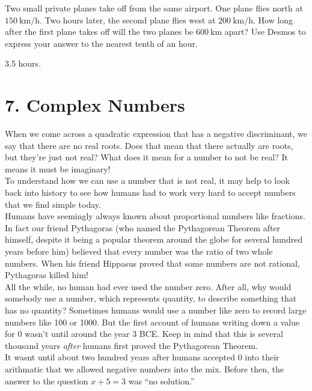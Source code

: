 \documentclass[12pt,fleqn]{book}
\newcommand{\prb}[1]{\begin{Exercise}#1\end{Exercise}}
\newcommand{\sol}[1]{\begin{Answer}#1\end{Answer}}
\begin{document}
\prb{Two small private planes take off from the same airport. One plane flies north at $150 \mathrm{~km} / \mathrm{h}$. Two hours later, the second plane flies west at $200 \mathrm{~km} / \mathrm{h}$. How long after the first plane takes off will the two planes be $600 \mathrm{~km}$ apart? Use Desmos to express your answer to the nearest tenth of an hour.}
\sol{3.5 hours.}













\chapter{7. Complex Numbers}
When we come across a quadratic expression that has a negative discriminant, we say that there are no real roots.  Does that mean that there actually are roots, but they're just not real?  What does it mean for a number to not be real?  It means it must be imaginary!
\\[1em]
To understand how we can use a number that is not real, it may help to look back into history to see how humans had to work very hard to accept numbers that we find simple today.
\\[1em]
Humans have seemingly always known about proportional numbers like fractions.  In fact our friend Pythagoras (who named the Pythagorean Theorem after himself, despite it being a popular theorem around the globe for several hundred years before him) believed that every number was the ratio of two whole numbers.  When his friend Hippasus proved that some numbers are not rational, Pythagoras killed him!
\\[1em]
All the while, no human had ever used the number zero.  After all, why would somebody use a number, which represents quantity, to describe something that has no quantity?  Sometimes humans would use a number like zero to record large numbers like 100 or 1000.  But the first account of humans writing down a value for 0 wasn't until around the year 3 BCE.  Keep in mind that this is several thousand years \emph{after} humans first proved the Pythagorean Theorem.
\\[1em]
It wasnt until about two hundred years after humans accepted 0 into their arithmatic that we allowed negative numbers into the mix.  Before then, the answer to the question $x+5=3$ was ``no solution.''
\\[1em]
\end{document}
